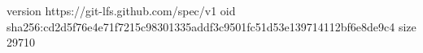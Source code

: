 version https://git-lfs.github.com/spec/v1
oid sha256:cd2d5f76e4e71f7215c98301335addf3c9501fc51d53e139714112bf6e8de9c4
size 29710
